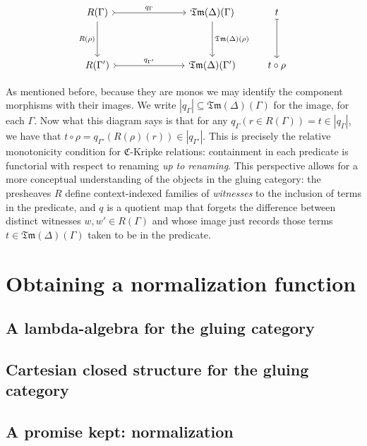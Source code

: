 \documentclass[12pt,twoside]{reedthesis}
\theoremstyle{definition}
\theoremstyle{remark}
\theoremstyle{plain}
\newcommand{\tm}{\mathfrak{Tm}}
\begin{document}
  \[\begin{tikzcd}
      {R (\Gamma)} &&& {\tm(\Delta) (\Gamma)} & t \\
      \\
      {R (\Gamma')} &&& {\tm(\Delta) (\Gamma')} & {t \circ \rho}
      \arrow["{q_{\Gamma}}", from=1-1, to=1-4, rightarrowtail]
      \arrow["{q_{\Gamma'}}", from=3-1, to=3-4, rightarrowtail]
      \arrow["{R (\rho)}"', from=1-1, to=3-1]
      \arrow["{\tm(\Delta) (\rho)}", from=1-4, to=3-4]
      \arrow[from=1-5, to=3-5, mapsto]
    \end{tikzcd}\]

  As mentioned before, because they are monos we may identify the component
  morphisms with their images. We write \( |q_{\Gamma}| \subseteq \tm(\Delta)(\Gamma) \) for the image,
  for each \( \Gamma \). Now what this diagram says is that for any
  \( q_{\Gamma }(r \in R(\Gamma)) = t \in |q_{\Gamma}|\), we have that
  \( t \circ \rho = q_{\Gamma'}(R(\rho)(r)) \in |q_{\Gamma'}|\). This is precisely the relative
  monotonicity condition for $\mathfrak{C}$-Kripke relations: containment in
  each predicate is functorial with respect to renaming \emph{up to renaming}.
  This perspective allows for a more conceptual understanding of the objects in
  the gluing category: the presheaves $R$ define context-indexed families of
  \emph{witnesses} to the inclusion of terms in the predicate, and $q$ is a
  quotient map that forgets the difference between distinct witnesses
  \( w, w' \in R(\Gamma) \) and whose image just records those terms
  \( t \in \tm (\Delta)(\Gamma)\) taken to be in the predicate.

\section{Obtaining a normalization function}
\subsection{A lambda-algebra for the gluing category}
\subsection{Cartesian closed structure for the gluing category}
\subsection{A promise kept: normalization}
\end{document}
